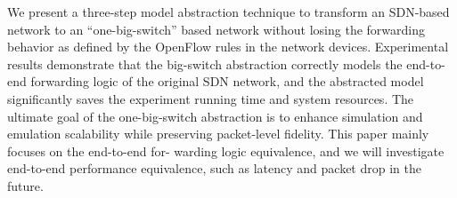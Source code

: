 \label{OBS:Sec:Conclusion}

We present a three-step model abstraction technique to transform an SDN-based network to
an ``one-big-switch'' based network without losing the forwarding behavior as
defined by the OpenFlow rules in the network devices.
Experimental results demonstrate that the big-switch abstraction correctly models
the end-to-end forwarding logic of the original SDN network,
and the abstracted model significantly saves the experiment running time and system resources.
The ultimate goal of the one-big-switch abstraction is to enhance simulation and emulation scalability while preserving packet-level fidelity.
This paper mainly focuses on the end-to-end for- warding logic equivalence,
and we will investigate end-to-end performance equivalence, such as latency and packet drop in the future.

